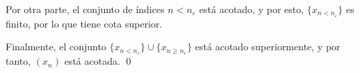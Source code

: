 \documentclass[11pt]{article}
\begin{document}
\begin{enumerate}[label=\alph*)]
    Por otra parte, el conjunto de índices $n<n_\varepsilon$ está acotado, y por esto, $\{x_{n<n_\varepsilon}\}$ es finito, por lo que tiene cota superior. %
    
    Finalmente, el conjunto $\{x_{n<n_\varepsilon}\} \cup \{x_{n\geq n_\varepsilon}\}$ está acotado superiormente, y por tanto, $(x_n)$ está acotada. \qed
\end{enumerate}
\end{document}

